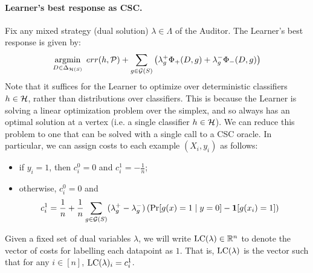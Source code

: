 \paragraph{Learner's best response as CSC.} Fix any mixed strategy (dual
solution) $ \lambda\in \Lambda$ of the Auditor. The Learner's
best response is given by:
\begin{equation} \label{eq:br} \operatorname*{\mathrm{argmin}}_{D \in \Delta_{\mathcal{H}(S)}} \;
  err(h, \mathcal{P}) + \sum_{g\in \mathcal{G}(S)} \left( \lambda_g^+ \Phi_+(D, g) +
    \lambda_g^- \Phi_-(D, g) \right)
\end{equation}
Note that it suffices for the Learner to optimize over deterministic
classifiers $h \in \mathcal{H}$, rather than distributions over
classifiers. This is because the Learner is solving a linear
optimization problem over the simplex, and so always has an optimal
solution at a vertex (i.e. a single classifier $h \in \mathcal{H}$). We can
reduce this problem to one that can be solved with a single call to a
{CSC oracle}.  In
particular, we can assign costs to each example $(X_i, y_i)$ as
follows:
\begin{itemize}
\item if $y_i = 1$, then $c_i^0 = 0$ and $c_i^1 = - \frac{1}{n}$;
\item otherwise, $c_i^0 = 0$ and
  \begin{align}
    c_i^1 = \frac{1}{n} &+ \frac{1}{n}\sum_{g\in \mathcal{G}(S)}
                          (\lambda_g^+ - \lambda_g^-) \left(\Pr[g(x) = 1\mid y = 0] -  \mathbf{1}[g(x_i) = 1]\right)
  \end{align}
\end{itemize}

\noindent Given a fixed set of dual variables $\lambda$, we will write
$\mathrm{LC}(\lambda) \in \mathbb{R}^n$ to denote the vector of costs for labelling
each datapoint as $1$. That is, $\mathrm{LC}(\lambda)$ is the vector such that
for any $i \in [n]$, $\mathrm{LC}(\lambda)_i = c_i^1$.

